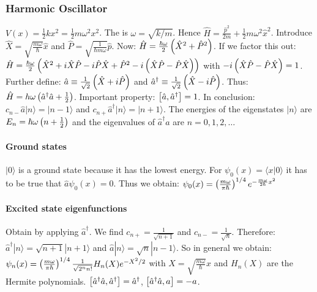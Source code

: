 \subsubsection{Harmonic Oscillator}
$V(x) = \frac{1}{2} k x^2 =  \frac{1}{2} m \omega^2 x^2$. The  is $\omega = \sqrt{k / m}$. Hence $\hat{H} = \frac{\hat{p}^2}{2 m}
+ \frac{1}{2} m \omega^2 \hat{x}^2$. Introduce $\hat{X} = \sqrt{\frac{m \omega}{\hbar}} \hat{x}$
and $\hat{P} = \sqrt{\frac{1}{\hbar m \omega}} \hat{p}$. Now:
$\hat{H} = \frac{\hbar \omega}{2} \left( \hat{X}^2 + \hat{P}^2 \right)$. If we factor this
out: $\hat{H} = \frac{\hbar \omega}{2} \left( \hat{X}^2 + i \hat{X} \hat{P} - i \hat{P} \hat{X} + \hat{P}^2 - i \left( \hat{X} \hat{P} - \hat{P} \hat{X} \right) \right)$
with $-i \left( \hat{X} \hat{P} - \hat{P} \hat{X} \right) = 1$. Further define:
$\hat{a} \equiv \frac{1}{\sqrt{2}} \left( \hat{X} + i \hat{P} \right)$ and
$\hat{a}^\dagger \equiv \frac{1}{\sqrt{2}} \left( \hat{X} - i \hat{P} \right)$. Thus:
$\hat{H} = h \omega \left( \hat{a}^\dagger \hat{a} + \frac{1}{2} \right)$. Important
property: $\left[ \hat{a},\hat{a}^\dagger \right] = 1$. In conclusion:
$c_{n-} \hat{a} | n \rangle = | n - 1 \rangle$ and
$c_{n+} \hat{a}^\dagger | n \rangle = | n + 1 \rangle$.
The energies of the eigenstates $| n \rangle$ are $E_n = \hbar \omega \left( n + \frac{1}{2} \right)$
and the eigenvalues of $\hat{a}^\dagger \hat{a}$ are $n=0,1,2,\dots$

\paragraph{Ground states}
$| 0 \rangle$ is a ground state because it has the lowest energy. For
$\psi_0(x) = \langle x | 0 \rangle$ it has to be true that $\hat{a} \psi_0(x) = 0$.
Thus we obtain: $\psi_0 (x) = \left( \frac{m \omega}{\pi \hbar} \right)^{1/4} e^{- \frac{m \omega}{2 \hbar} x^2}$

\paragraph{Excited state eigenfunctions}
Obtain by applying $\hat{a}^\dagger$. We find $c_{n+} = \frac{1}{\sqrt{n+1}}$
and $c_{n-} = \frac{1}{\sqrt{n}}$. Therefore:
$\hat{a}^\dagger | n \rangle = \sqrt{n + 1} | n + 1 \rangle$ and
$\hat{a} | n \rangle = \sqrt{n} | n -1 \rangle$. So in general we obtain:
$\psi_n (x) = \left( \frac{m \omega}{\pi \hbar} \right)^{1/4} \frac{1}{\sqrt{2^n n!}} H_n(X) e^{-X^2 / 2}$
with $X = \sqrt{\frac{m \omega}{\hbar}} x$ and $H_n(X)$ are the Hermite polynomials.
$\left[ \hat{a}^\dagger \hat{a} , \hat{a}^\dagger \right] = \hat{a}^\dagger$,
$\left[ \hat{a}^\dagger \hat{a} , a \right] = - a$.

